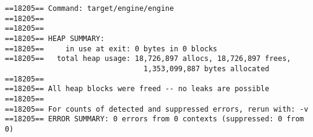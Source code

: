 \begin{verbatim}
==18205== Command: target/engine/engine
==18205==
==18205==
==18205== HEAP SUMMARY:
==18205==     in use at exit: 0 bytes in 0 blocks
==18205==   total heap usage: 18,726,897 allocs, 18,726,897 frees,
                                1,353,099,887 bytes allocated
==18205==
==18205== All heap blocks were freed -- no leaks are possible
==18205==
==18205== For counts of detected and suppressed errors, rerun with: -v
==18205== ERROR SUMMARY: 0 errors from 0 contexts (suppressed: 0 from 0)
\end{verbatim}
